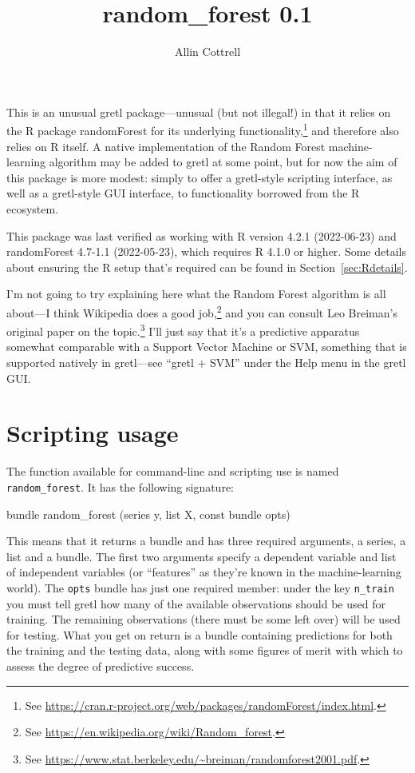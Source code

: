 \documentclass{article}
\begin{document}
\setlength{\parindent}{0pt}
\setlength{\parskip}{1ex}

\title{random\_forest 0.1} \author{Allin Cottrell}
\maketitle

This is an unusual gretl package---unusual (but not illegal!) in that
it relies on the \textsf{R} package \textsf{randomForest} for its
underlying functionality,\footnote{See
  \url{https://cran.r-project.org/web/packages/randomForest/index.html}.}
and therefore also relies on \textsf{R} itself. A native
implementation of the Random Forest machine-learning algorithm may be
added to gretl at some point, but for now the aim of this package is
more modest: simply to offer a gretl-style scripting interface, as
well as a gretl-style GUI interface, to functionality borrowed from
the \textsf{R} ecosystem.

This package was last verified as working with \textsf{R} version
4.2.1 (2022-06-23) and \textsf{randomForest} 4.7-1.1 (2022-05-23),
which requires \textsf{R} 4.1.0 or higher. Some details about ensuring
the \textsf{R} setup that's required can be found in
Section~\ref{sec:Rdetails}.

I'm not going to try explaining here what the Random Forest algorithm
is all about---I think Wikipedia does a good job,\footnote{See
  \url{https://en.wikipedia.org/wiki/Random_forest}.} and you can
consult Leo Breiman's original paper on the topic.\footnote{See
  \url{https://www.stat.berkeley.edu/~breiman/randomforest2001.pdf}.}
I'll just say that it's a predictive apparatus somewhat comparable
with a Support Vector Machine or SVM, something that is supported
natively in gretl---see ``gretl + SVM'' under the \textsf{Help} menu
in the gretl GUI.

\section{Scripting usage}

The function available for command-line and scripting use is named
\texttt{random\_forest}. It has the following signature:
%
\begin{code}
bundle random_forest (series y, list X, const bundle opts)
\end{code}
%
This means that it returns a bundle and has three required arguments,
a series, a list and a bundle. The first two arguments specify a
dependent variable and list of independent variables (or ``features''
as they're known in the machine-learning world). The \texttt{opts}
bundle has just one required member: under the key \texttt{n\_train}
you must tell gretl how many of the available observations should be
used for training.  The remaining observations (there must be some
left over) will be used for testing. What you get on return is a
bundle containing predictions for both the training and the testing
data, along with some figures of merit with which to assess the degree
of predictive success.
\end{document}
